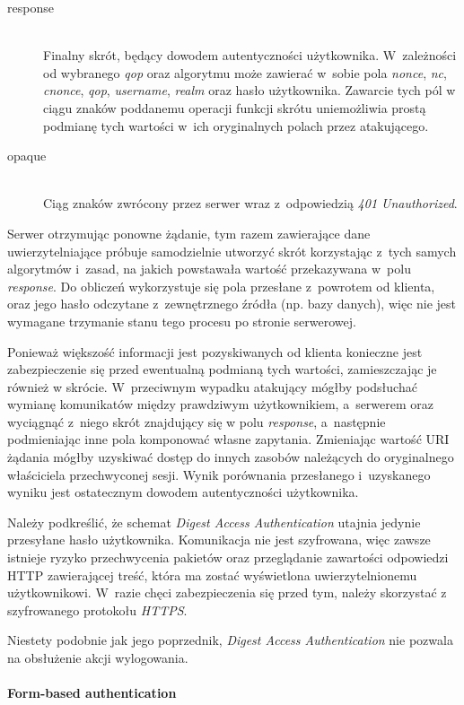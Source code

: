 \documentclass[11pt]{aghdpl}
\begin{document}
\begin{description}
\item[response] \hfill \\
Finalny skrót, będący dowodem autentyczności użytkownika. W~zależności od wybranego \emph{qop} oraz algorytmu może zawierać w~sobie pola \emph{nonce}, \emph{nc}, \emph{cnonce}, \emph{qop}, \emph{username}, \emph{realm} oraz hasło użytkownika. Zawarcie tych pól w ciągu znaków poddanemu operacji funkcji skrótu uniemożliwia prostą podmianę tych wartości w~ich oryginalnych polach przez atakującego.
\item[opaque] \hfill \\
Ciąg znaków zwrócony przez serwer wraz z~odpowiedzią \emph{401 Unauthorized}.
\end{description}

Serwer otrzymując ponowne żądanie, tym razem zawierające dane uwierzytelniające próbuje samodzielnie utworzyć skrót korzystając z~tych samych algorytmów i~zasad, na jakich powstawała wartość przekazywana w~polu \emph{response}. Do obliczeń wykorzystuje się pola przesłane z~powrotem od klienta, oraz jego hasło odczytane z~zewnętrznego źródła (np. bazy danych), więc nie jest wymagane trzymanie stanu tego procesu po stronie serwerowej.

Ponieważ większość informacji jest pozyskiwanych od klienta konieczne jest zabezpieczenie się przed ewentualną podmianą tych wartości, zamieszczając je również w skrócie. W~przeciwnym wypadku atakujący mógłby podsłuchać wymianę komunikatów między prawdziwym użytkownikiem, a~serwerem oraz wyciągnąć z~niego skrót znajdujący się w polu \emph{response}, a~następnie podmieniając inne pola komponować własne zapytania. Zmieniając wartość URI żądania mógłby uzyskiwać dostęp do innych zasobów należących do oryginalnego właściciela przechwyconej sesji. Wynik porównania przesłanego i~uzyskanego wyniku jest ostatecznym dowodem autentyczności użytkownika.

Należy podkreślić, że schemat \emph{Digest Access Authentication} utajnia jedynie przesyłane hasło użytkownika. Komunikacja nie jest szyfrowana, więc zawsze istnieje ryzyko przechwycenia pakietów oraz przeglądanie zawartości odpowiedzi HTTP zawierającej treść, która ma zostać wyświetlona uwierzytelnionemu użytkownikowi. W~razie chęci zabezpieczenia się przed tym, należy skorzystać z szyfrowanego protokołu \emph{HTTPS}.

Niestety podobnie jak jego poprzednik, \emph{Digest Access Authentication} nie pozwala na obsłużenie akcji wylogowania.

\paragraph{Form-based authentication}
\end{document}
